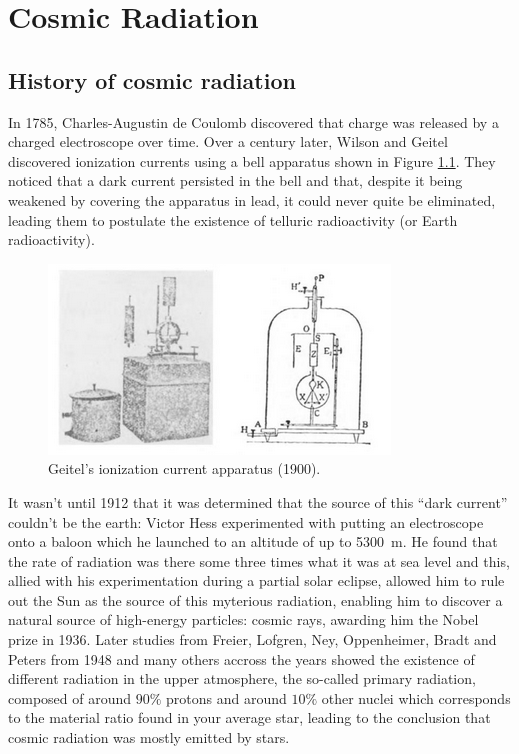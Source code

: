 
\chapter{Cosmic Radiation}

\section{History of cosmic radiation}

In 1785, Charles-Augustin de Coulomb discovered that charge was released by a charged electroscope over time. Over a century later, Wilson and Geitel discovered ionization currents using a bell apparatus shown in Figure \ref{fig:bell}. They noticed that a dark current persisted in the bell and that, despite it being weakened by covering the apparatus in lead, it could never quite be eliminated, leading them to postulate the existence of telluric radioactivity (or Earth radioactivity).

\begin{figure}[htbp]
\centering
\includegraphics[width=0.6\linewidth]{./fig/bell.png}
\caption{Geitel's ionization current apparatus (1900).}
\label{fig:bell}
\end{figure}

It wasn't until 1912 that it was determined that the source of this ``dark current'' couldn't be the earth: Victor Hess experimented with putting an electroscope onto a baloon which he launched to an altitude of up to \SI{5300}{\meter}. He found that the rate of radiation was there some three times what it was at sea level and this, allied with his experimentation during a partial solar eclipse, allowed him to rule out the Sun as the source of this myterious radiation, enabling him to discover a natural source of high-energy particles: cosmic rays, awarding him the Nobel prize in 1936. Later studies from Freier, Lofgren, Ney, Oppenheimer, Bradt and Peters from 1948 and many others accross the years showed the existence of different radiation in the upper atmosphere, the so-called primary radiation, composed of around $90\%$ protons and around $10\%$ other nuclei which corresponds to the material ratio found in your average star, leading to the conclusion that cosmic radiation was mostly emitted by stars.

